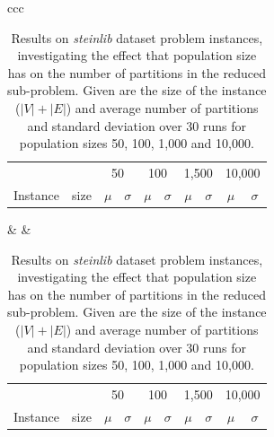 \documentclass[preprint]{elsarticle}
\begin{document}
\begin{table}
\centering
\caption[Size of reduced sub-problem (full results)]{Results on \emph{steinlib} dataset problem instances, investigating the effect that population size has on the number of partitions in the reduced sub-problem. Given are the size of the instance (\(|V|+|E|\)) and average number of partitions and standard deviation over 30 runs for population sizes 50, 100, 1,000 and 10,000.}\label{tab:app:pop}
\begin{tabular}{ccc}
\centering
\begin{adjustbox}{width=0.48\textwidth}
\begin{tabular}{lrrrrrrrrr} \toprule
 &  & \multicolumn{2}{c}{50} & \multicolumn{2}{c}{100} & \multicolumn{2}{c}{1,500} & \multicolumn{2}{c}{10,000}\\
\cmidrule(lr){3-4} \cmidrule(lr){5-6} \cmidrule(lr){7-8} \cmidrule(lr){9-10} 
Instance & size & \multicolumn{1}{c}{\(\mu\)}&\multicolumn{1}{c}{\(\sigma\)} & \multicolumn{1}{c}{\(\mu\)}&\multicolumn{1}{c}{\(\sigma\)}& \multicolumn{1}{c}{\(\mu\)}&\multicolumn{1}{c}{\(\sigma\)} & \multicolumn{1}{c}{\(\mu\)}&\multicolumn{1}{c}{\(\sigma\)}\\ \midrule
%

%
\bottomrule
\end{tabular}
\end{adjustbox}
&  &
\centering
\begin{adjustbox}{width=0.48\textwidth}
\begin{tabular}{lrrrrrrrrr} \toprule
 &  & \multicolumn{2}{c}{50} & \multicolumn{2}{c}{100} & \multicolumn{2}{c}{1,500} & \multicolumn{2}{c}{10,000}\\
\cmidrule(lr){3-4} \cmidrule(lr){5-6} \cmidrule(lr){7-8} \cmidrule(lr){9-10} 
Instance & size & \multicolumn{1}{c}{\(\mu\)}&\multicolumn{1}{c}{\(\sigma\)} & \multicolumn{1}{c}{\(\mu\)}&\multicolumn{1}{c}{\(\sigma\)}& \multicolumn{1}{c}{\(\mu\)}&\multicolumn{1}{c}{\(\sigma\)} & \multicolumn{1}{c}{\(\mu\)}&\multicolumn{1}{c}{\(\sigma\)}\\ \midrule
%

%
\bottomrule
\end{tabular}
\end{adjustbox}

\end{tabular}
\end{table}
\end{document}
